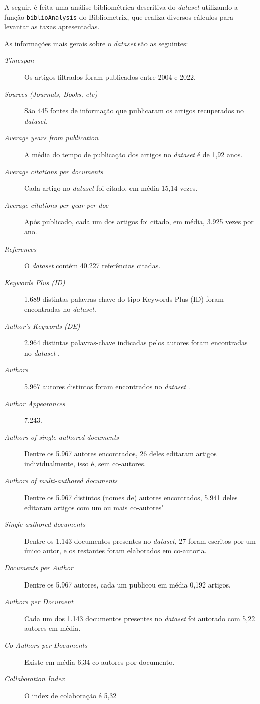 A seguir, é feita uma análise bibliométrica descritiva do \textit{dataset} utilizando a função \texttt{biblioAnalysis} do Bibliometrix, que realiza diversos cálculos para levantar as taxas apresentadas.

As informações mais gerais sobre o \textit{dataset} são as seguintes:
\begin{description}
    \item [\textit{Timespan}] Os artigos filtrados foram publicados entre 2004 e 2022.
    \item [\textit{Sources (Journals, Books, etc)}] São 445 fontes de informação que publicaram os artigos recuperados no \textit{dataset}.
    \item [\textit{Average years from publication}] A média do tempo de publicação dos artigos no \textit{dataset} é de 1,92 anos.
    \item [\textit{Average citations per documents}] Cada artigo no \textit{dataset} foi citado, em média 15,14 vezes.
    \item [\textit{Average citations per year per doc}] Após publicado, cada um dos artigos foi citado, em média, 3.925 vezes por ano.
    \item [\textit{References}] O \textit{dataset} contém 40.227 referências citadas.
    \item [\textit{Keywords Plus (ID)}] 1.689 distintas palavras-chave do tipo Keywords Plus (ID) foram encontradas no \textit{dataset}.
    \item [\textit{Author's Keywords (DE)}] 2.964 distintas palavras-chave indicadas pelos autores foram encontradas no \textit{dataset} .
    \item [\textit{Authors}] 5.967 autores distintos foram encontrados no \textit{dataset} .
    \item [\textit{Author Appearances}] 7.243.
    \item [\textit{Authors of single-authored documents}] Dentre os 5.967 autores encontrados, 26 deles editaram artigos individualmente, isso é, sem co-autores.
    \item [\textit{Authors of multi-authored documents}] Dentre os 5.967 distintos (nomes de) autores encontrados, 5.941 deles editaram artigos com um ou mais co-autores"
    \item [\textit{Single-authored documents}] Dentre os 1.143 documentos presentes no \textit{dataset}, 27 foram escritos por um único autor, e os restantes foram elaborados em co-autoria.
    \item [\textit{Documents per Author}] Dentre os 5.967 autores, cada um publicou em média 0,192 artigos.
    \item [\textit{Authors per Document}] Cada um dos 1.143 documentos presentes no \textit{dataset} foi autorado com 5,22 autores em média.
    \item [\textit{Co-Authors per Documents}] Existe em média 6,34 co-autores por documento.
    \item [\textit{Collaboration Index}] O index de colaboração é 5,32
\end{description}

